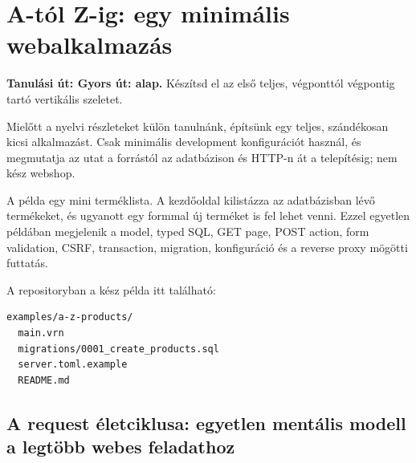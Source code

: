 \chapter{A-tól Z-ig: egy minimális webalkalmazás}

\noindent\textbf{Tanulási út: Gyors út: alap.} Készítsd el az első teljes, végponttól végpontig tartó vertikális szeletet.\par\medskip





Mielőtt a nyelvi részleteket külön tanulnánk, építsünk egy teljes, szándékosan kicsi alkalmazást. Csak minimális development konfigurációt használ, és megmutatja az utat a forrástól az adatbázison és HTTP-n át a telepítésig; nem kész webshop.

A példa egy mini terméklista. A kezdőoldal kilistázza az adatbázisban lévő termékeket, és ugyanott egy formmal új terméket is fel lehet venni. Ezzel egyetlen példában megjelenik a model, typed SQL, GET page, POST action, form validation, CSRF, transaction, migration, konfiguráció és a reverse proxy mögötti futtatás.

A repositoryban a kész példa itt található:

\begin{lstlisting}
examples/a-z-products/
  main.vrn
  migrations/0001_create_products.sql
  server.toml.example
  README.md
\end{lstlisting}

\section{A request életciklusa: egyetlen mentális modell a legtöbb webes feladathoz}

